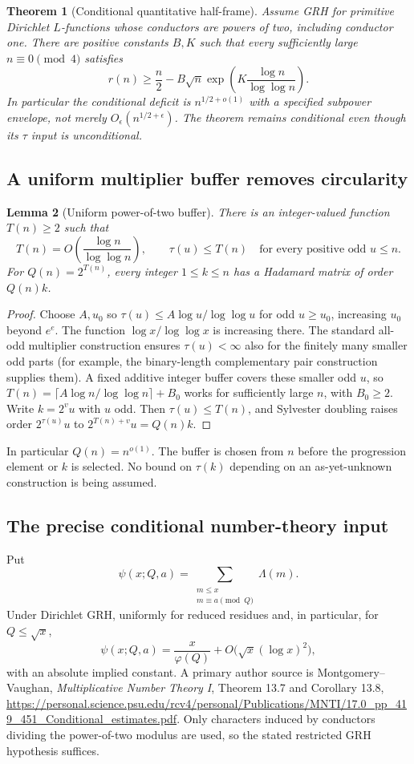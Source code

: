 \documentclass[11pt]{article}
\newtheorem{theorem}{Theorem}[section]
\newtheorem{lemma}[theorem]{Lemma}
\begin{document}
\begin{theorem}[Conditional quantitative half-frame]
Assume GRH for primitive Dirichlet $L$-functions whose conductors are
powers of two, including conductor one. There are positive constants
$B,K$ such that every sufficiently large $n\equiv0\pmod4$ satisfies
\[
 \boxed{r(n)\ge\frac n2-
 B\sqrt n\exp\!\left(K\frac{\log n}{\log\log n}\right).}
\]
In particular the conditional deficit is $n^{1/2+o(1)}$ with a
specified subpower envelope, not merely $O_\epsilon(n^{1/2+\epsilon})$.
The theorem remains conditional even though its $\tau$ input is
unconditional.
\end{theorem}

\subsection{A uniform multiplier buffer removes circularity}
\begin{lemma}[Uniform power-of-two buffer]
There is an integer-valued function $T(n)\ge2$ such that
\[
 T(n)=O\!\left(\frac{\log n}{\log\log n}\right),
 \qquad \tau(u)\le T(n)\quad
 \text{for every positive odd }u\le n.
\]
For $Q(n)=2^{T(n)}$, every integer $1\le k\le n$ has a Hadamard
matrix of order $Q(n)k$.
\end{lemma}
\begin{proof}
Choose $A,u_0$ so $\tau(u)\le A\log u/\log\log u$ for odd
$u\ge u_0$, increasing $u_0$ beyond $e^e$. The function
$\log x/\log\log x$ is increasing there. The standard all-odd
multiplier construction ensures $\tau(u)<\infty$ also for the finitely
many smaller odd parts (for example, the binary-length complementary
pair construction supplies them). A fixed additive integer buffer
covers these smaller odd $u$, so
$T(n)=\lceil A\log n/\log\log n\rceil+B_0$ works for sufficiently
large $n$, with $B_0\ge2$. Write $k=2^vu$ with $u$ odd. Then
$\tau(u)\le T(n)$, and Sylvester doubling raises order
$2^{\tau(u)}u$ to $2^{T(n)+v}u=Q(n)k$.
\end{proof}

In particular $Q(n)=n^{o(1)}$. The buffer is chosen from $n$ before
the progression element or $k$ is selected. No bound on $\tau(k)$
depending on an as-yet-unknown construction is being assumed.

\subsection{The precise conditional number-theory input}
Put
\[
 \psi(x;Q,a)=\sum_{\substack{m\le x\\m\equiv a\pmod Q}}\Lambda(m).
\]
Under Dirichlet GRH, uniformly for reduced residues and, in particular,
for $Q\le\sqrt x$,
\[
 \psi(x;Q,a)=\frac{x}{\varphi(Q)}+
 O\bigl(\sqrt x(\log x)^2\bigr),
\]
with an absolute implied constant. A primary author source is
Montgomery--Vaughan, \emph{Multiplicative Number Theory I},
Theorem 13.7 and Corollary 13.8,
\url{https://personal.science.psu.edu/rcv4/personal/Publications/MNTI/17.0_pp_419_451_Conditional_estimates.pdf}.
Only characters induced by conductors dividing the power-of-two
modulus are used, so the stated restricted GRH hypothesis suffices.
\end{document}
